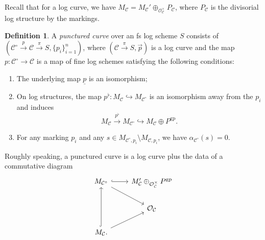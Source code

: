 \documentclass{amsart}
\theoremstyle{definition}
\newtheorem{defn}[thm]{Definition}
\theoremstyle{remark}
\theoremstyle{plain}
\theoremstyle{definition}
\theoremstyle{remark}
\newcommand{\mc}[1]{\mathcal{#1}}
\newcommand{\mr}[1]{\mathrm{#1}}
\newcommand{\on}[1]{\operatorname{#1}}
\newcommand{\ul}[1]{\underline{#1}}
\newcommand{\1}{\mathbf{1}}
\newcommand{\2}{\mathbf{2}}
\newcommand{\3}{\mathbf{3}}
\begin{document}
Recall that for a log curve, we have \(M_{\mc{C}} = M_{\mc{C}}' \oplus_{\mc{O}_{\mc{C}}^{\times}} P_{\mc{C}}\), where \(P_{\mc{C}}\) is the divisorial log structure by the markings.

\begin{defn}
    A \textit{punctured curve} over an fs log scheme \(S\) consists of \((\mc{C}^{\circ} \xrightarrow{p} \mc{C} \xrightarrow{\pi} S, \{p_i\}_{i=1}^n)\), where \((\mc{C} \xrightarrow{\pi} S, \vec{p})\) is a log curve and the map \(p \colon \mc{C}^{\circ} \to \mc{C}\) is a map of fine log schemes satisfying the following conditions:
    \begin{enumerate}
        \item The underlying map \(\ul{p}\) is an isomorphism;
        \item On log structures, the map \(p^{\flat} \colon M_{\mc{C}} \hookrightarrow M_{\mc{C}^{\circ}}\) is an isomorphism away from the \(p_i\) and induces
            \[ M_{\mc{C}} \xrightarrow{p^{\flat}} M_{\mc{C}^{\circ}} \hookrightarrow M_{\mc{C}} \oplus P^{\mr{gp}}. \]
        \item For any marking \(p_i\) and any \(s \in M_{\mc{C}^{\circ}, p_i} \setminus M_{\mc{C}, p_i}\), we have \(\alpha_{\mc{C}^{\circ}}(s) = 0\).
    \end{enumerate}
\end{defn}

Roughly speaking, a punctured curve is a log curve plus the data of a commutative diagram
\begin{equation*}
\begin{tikzcd}
    M_{\mc{C}^{\circ}} \ar{dr} \ar[hookrightarrow]{r} & M_{\mc{C}}' \oplus_{\mc{O}_{\mc{C}}^{\times}} P^{\on{gp}} \\
    & \mc{O}_{\mc{C}} \\
    M_{\mc{C}} \ar[hookrightarrow]{uu} \ar{ur}.
\end{tikzcd}
\end{equation*}
\end{document}

